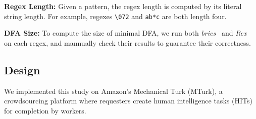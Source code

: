 \textbf{Regex Length:}
Given a pattern, the regex length is computed by its literal string length. For example, regexes \verb!\072! and \verb!ab*c! are both length four.

\textbf{DFA Size:}
To compute the size of minimal DFA, we run both \textit{brics}~\cite{brics} and \textit{Rex}~\cite{rex} on each regex, and mannually check their results to guarantee their correctness.

\subsection{Design}
We implemented this study on Amazon's Mechanical Turk (MTurk), a crowdsourcing platform where requesters create human intelligence tasks (HITs) for completion by workers.


